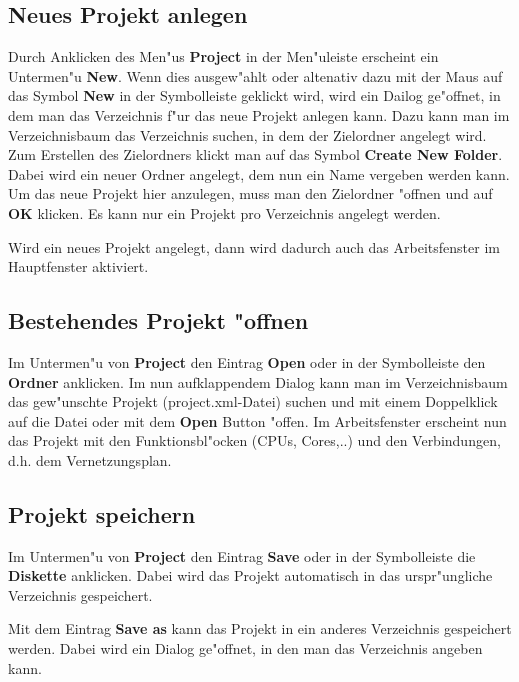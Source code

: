 \documentclass[a4paper,titlepage,12pt,ngerman]{scrbook}
\begin{document}
\subsection{Neues Projekt anlegen}
Durch Anklicken des Men"us {\bf Project} in der Men"uleiste erscheint ein Untermen"u {\bf New}. Wenn dies ausgew"ahlt oder altenativ dazu mit der Maus auf das Symbol {\bf New} in der Symbolleiste geklickt wird, wird ein Dailog ge"offnet, in dem man das Verzeichnis f"ur das neue Projekt anlegen kann. Dazu kann man im Verzeichnisbaum das Verzeichnis suchen, in dem der Zielordner angelegt wird. Zum Erstellen des Zielordners klickt man auf das Symbol {\bf Create New Folder}. Dabei wird ein neuer Ordner angelegt, dem nun ein Name vergeben werden kann. Um das neue Projekt hier anzulegen, muss man den Zielordner "offnen und auf {\bf OK} klicken.\newline
Es kann nur ein Projekt pro Verzeichnis angelegt werden.\par
Wird ein neues Projekt angelegt, dann wird dadurch auch das Arbeitsfenster im Hauptfenster aktiviert.


\subsection{Bestehendes Projekt "offnen}
Im Untermen"u von {\bf Project} den Eintrag {\bf Open} oder in der Symbolleiste den {\bf Ordner} anklicken. Im nun aufklappendem Dialog kann man im Verzeichnisbaum das gew"unschte Projekt (project.xml-Datei) suchen und mit einem Doppelklick auf die Datei oder mit dem {\bf Open} Button "offen.
Im Arbeitsfenster erscheint nun das Projekt mit den Funktionsbl"ocken (CPUs, Cores,..) und den Verbindungen, d.h. dem Vernetzungsplan.\par


\subsection{Projekt speichern}
Im Untermen"u von {\bf Project} den Eintrag {\bf Save} oder in der Symbolleiste die {\bf Diskette} anklicken. Dabei wird das Projekt automatisch in das urspr"ungliche Verzeichnis gespeichert.\par
Mit dem Eintrag {\bf Save as} kann das Projekt in ein anderes Verzeichnis gespeichert werden. Dabei wird ein Dialog ge"offnet, in den man das Verzeichnis angeben kann.\par
\end{document}
